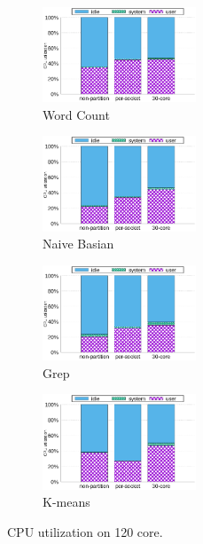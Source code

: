 \begin{figure}[tb]
    \centering
    \begin{subfigure}[b]{0.25\textwidth}
        \includegraphics[width=1.8in]{graph/wc_cpuutils_docker.eps}
        \caption{Word Count}
    \end{subfigure}%
    \begin{subfigure}[b]{0.25\textwidth}
        \includegraphics[width=1.8in]{graph/nb_cpuutils_docker.eps}
        \caption{Naive Basian}
    \end{subfigure}%
    \begin{subfigure}[b]{0.25\textwidth}
        \includegraphics[width=1.8in]{graph/grep_cpuutils_docker.eps}
        \caption{Grep}
    \end{subfigure}%
    \begin{subfigure}[b]{0.25\textwidth}
        \includegraphics[width=1.8in]{graph/kmeans_cpuutils_docker.eps}
        \caption{K-means}
    \end{subfigure}%
        \centering
    \caption{CPU utilization on 120 core.}
    \label{fig:utilization2}
\end{figure}
